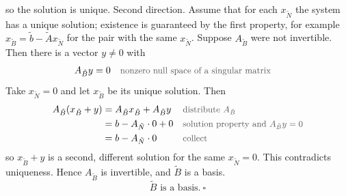 \documentclass[a4paper,11pt]{article}
\newif\ifexplain
\newcommand{\why}[1]{\text{\small\color{black!65}#1}}
\newcommand{\explain}[1]{\ifexplain\begin{erklbox}#1\end{erklbox}\fi}
\begin{document}
so the solution is unique.
Second direction. Assume that for each $x_{\tilde N}$ the system has a unique solution; existence is guaranteed by the first property, for example $x_{\tilde B}=\tilde b-\tilde Ax_{\tilde N}$ for the pair with the same $x_{\tilde N}$. Suppose $A_{\tilde B}$ were not invertible. Then there is a vector $y\neq 0$ with
\begin{align*}
A_{\tilde B}y&=0&&\why{nonzero null space of a singular matrix}
\end{align*}
Take $x_{\tilde N}=0$ and let $x_{\tilde B}$ be its unique solution. Then
\begin{align*}
A_{\tilde B}(x_{\tilde B}+y)&=A_{\tilde B}x_{\tilde B}+A_{\tilde B}y&&\why{distribute $A_{\tilde B}$}\\
&=b-A_{\tilde N}\cdot 0+0&&\why{solution property and $A_{\tilde B}y=0$}\\
&=b-A_{\tilde N}\cdot 0&&\why{collect}
\end{align*}
so $x_{\tilde B}+y$ is a second, different solution for the same $x_{\tilde N}=0$. This contradicts uniqueness. Hence $A_{\tilde B}$ is invertible, and $\tilde B$ is a basis.
\[ \boxed{\tilde B \text{ is a basis.}\ \square} \]
\explain{Der Widerspruch kommt aus einem einzigen Nullvektor: Eine singuläre quadratische Matrix hat einen nonzero-Kernvektor, und der kann zu jeder Lösung dazugezählt werden, ohne die rechte Seite zu ändern. Da es aber nur eine Lösung gibt, kann der Kern nicht nonzero sein. Eine quadratische Matrix mit Kern $\{0\}$ ist invertierbar, also ist $\tilde B$ eine Basis.}
\explain{Die dritte Eigenschaft aus dem Hinweis steckt jetzt ebenfalls drin: Statt das alte Dictionary nach $x_{\tilde B}$ umzuformen, hätte man $Ax=b$ auch direkt nach $x_{\tilde B}$ auflösen und $x_{\tilde B}=A_{\tilde B}^{-1}b-A_{\tilde B}^{-1}A_{\tilde N}x_{\tilde N}$ notieren. Beide Wege beschreiben dieselbe Lösungsmenge, und weil zu jedem $x_{\tilde N}$ genau ein $x_{\tilde B}$ gehört, liefern beide dieselben Gleichungen. Das ist der Grund, warum in Exercise 6.3 der Pivot einfach durch einen neuen Aufruf von \texttt{create\_simplex\_dictionary} ersetzt werden darf.}
\explain{Zur Rolle von $\bar a_{i_0q_0}>0$: Für die Aussage $\tilde B$ ist eine Basis wäre $\neq 0$ genug, denn nur der Betrag steht im Nenner. Die Positivität aus dem Quotiententest sorgt zusätzlich dafür, dass die neue Basislösung wieder zulässig ist, weil $x_{i_0}$ dabei auf null fällt und keine Grundvariable unter null gedrückt wird. Diese Zulässigkeit ist aber nicht Teil der Behauptung.}
\end{document}
